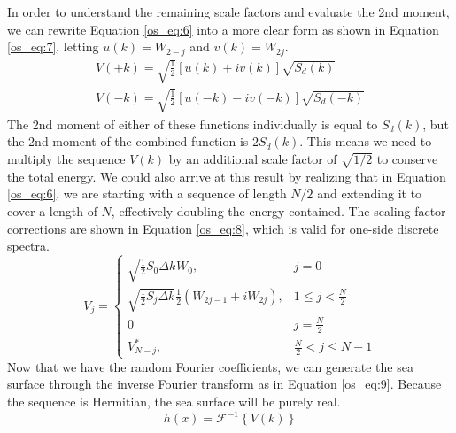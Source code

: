 In order to understand the remaining scale factors and evaluate the 2nd moment, we can rewrite Equation \ref{os_eq:6} into a more clear form as shown in Equation \ref{os_eq:7}, letting $u(k) = W_{2-j}$ and $v(k) = W_{2j}$.
\begin{equation}
  \begin{gathered}
  \label{os_eq:7}
  V(+k) = \sqrt{\frac{1}{2}}\left[u(k) + iv(k) \right]\sqrt{S_d(k)} \\
  V(-k) = \sqrt{\frac{1}{2}}\left[u(-k) - iv(-k) \right]\sqrt{S_d(-k)}
  \end{gathered}
\end{equation}
The 2nd moment of either of these functions individually is equal to $S_d(k)$, but the 2nd moment of the combined function is $2S_d(k)$. This means we need to multiply the sequence $V(k)$ by an additional scale factor of $\sqrt{1/2}$ to conserve the total energy. We could also arrive at this result by realizing that in Equation \ref{os_eq:6}, we are starting with a sequence of length $N/2$ and extending it to cover a length of $N$, effectively doubling the energy contained. The scaling factor corrections are shown in Equation \ref{os_eq:8}, which is valid for one-side discrete spectra.
\begin{equation}
  \label{os_eq:8}   
  V_j = \begin{cases}
    \sqrt{\frac{1}{2}S_0\Delta k}W_0, & j = 0 \\
    \sqrt{\frac{1}{2}S_j\Delta k}\frac{1}{2}\left(W_{2j-1} + iW_{2j} \right), & 1 \leq j < \frac{N}{2} \\
    0 & j = \frac{N}{2} \\
    V_{N-j}^*, &  \frac{N}{2} < j \leq N-1 
  \end{cases} 
\end{equation}
Now that we have the random Fourier coefficients, we can generate the sea surface through the inverse Fourier transform as in Equation \ref{os_eq:9}. Because the sequence is Hermitian, the sea surface will be purely real.
\begin{equation}
  \label{os_eq:9}
  h(x) = \mathcal{F}^{-1}\left\{V(k) \right\}
  \end{equation}

